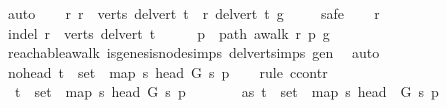 \begin{isabellebody}
\ auto\isanewline
\ \ \isamarkupfalse%
\ {\isachardoublequoteopen}{\isacharparenleft}{\kern0pt}{\isasymforall}r{\isachardot}{\kern0pt}\ r\ {\isasymin}\ verts\ {\isacharparenleft}{\kern0pt}del{\isacharunderscore}{\kern0pt}vert\ t{\isacharparenright}{\kern0pt}\ {\isasymlongrightarrow}\ r\ {\isasymrightarrow}\isactrlsup {\isacharasterisk}{\kern0pt}\isactrlbsub del{\isacharunderscore}{\kern0pt}vert\ t\isactrlesub \ g{\isacharparenright}{\kern0pt}{\isachardoublequoteclose}\ \isanewline
\ \ \isamarkupfalse%
\ safe\isanewline
\ \ \isamarkupfalse%
\ r\isanewline
\ \ \isamarkupfalse%
\ in{\isacharunderscore}{\kern0pt}del{\isacharcolon}{\kern0pt}\ {\isachardoublequoteopen}r\ {\isasymin}\ verts\ {\isacharparenleft}{\kern0pt}del{\isacharunderscore}{\kern0pt}vert\ t{\isacharparenright}{\kern0pt}{\isachardoublequoteclose}\isanewline
\ \ \isamarkupfalse%
\ \isamarkupfalse%
\ p\ \ path{\isacharcolon}{\kern0pt}\ {\isachardoublequoteopen}awalk\ r\ p\ g{\isachardoublequoteclose}\ \isanewline
\ \ \ \ \isamarkupfalse%
\ reachable{\isacharunderscore}{\kern0pt}awalk\ is{\isacharunderscore}{\kern0pt}genesis{\isacharunderscore}{\kern0pt}node{\isachardot}{\kern0pt}simps\ del{\isacharunderscore}{\kern0pt}vert{\isacharunderscore}{\kern0pt}simps\ gen\ \isamarkupfalse%
\ auto\isanewline
\ \ \isamarkupfalse%
\ no{\isacharunderscore}{\kern0pt}head{\isacharcolon}{\kern0pt}\ {\isachardoublequoteopen}t\ {\isasymnotin}\ {\isacharparenleft}{\kern0pt}set\ {\isacharparenleft}{\kern0pt}\ map\ {\isacharparenleft}{\kern0pt}{\isasymlambda}s{\isachardot}{\kern0pt}\ {\isacharparenleft}{\kern0pt}head\ G\ s{\isacharparenright}{\kern0pt}{\isacharparenright}{\kern0pt}\ p{\isacharparenright}{\kern0pt}{\isacharparenright}{\kern0pt}{\isachardoublequoteclose}\isanewline
\ \ \isamarkupfalse%
\ {\isacharparenleft}{\kern0pt}rule\ ccontr{\isacharparenright}{\kern0pt}\isanewline
\ \ \ \ \isamarkupfalse%
\ {\isachardoublequoteopen}{\isasymnot}\ t\ {\isasymnotin}\ {\isacharparenleft}{\kern0pt}set\ {\isacharparenleft}{\kern0pt}\ map\ {\isacharparenleft}{\kern0pt}{\isasymlambda}s{\isachardot}{\kern0pt}\ {\isacharparenleft}{\kern0pt}head\ G\ s{\isacharparenright}{\kern0pt}{\isacharparenright}{\kern0pt}\ p{\isacharparenright}{\kern0pt}{\isacharparenright}{\kern0pt}{\isachardoublequoteclose}\isanewline
\ \ \ \ \isamarkupfalse%
\ \isamarkupfalse%
\ as{\isacharcolon}{\kern0pt}\ {\isachardoublequoteopen}t\ {\isasymin}\ {\isacharparenleft}{\kern0pt}set\ {\isacharparenleft}{\kern0pt}\ map\ {\isacharparenleft}{\kern0pt}{\isasymlambda}s{\isachardot}{\kern0pt}\ {\isacharparenleft}{\kern0pt}head\ \ G\ s{\isacharparenright}{\kern0pt}{\isacharparenright}{\kern0pt}\ p{\isacharparenright}{\kern0pt}{\isacharparenright}{\kern0pt}{\isachardoublequoteclose}\isanewline

\end{isabellebody}
